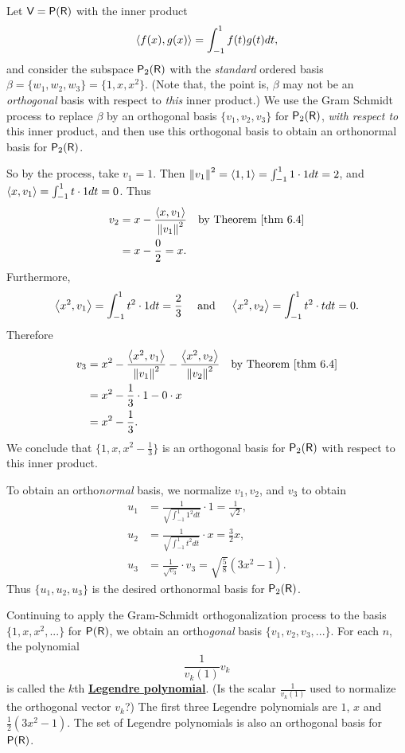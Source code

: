 \begin{example} \label{example 6.2.5}
Let \(\textsf{V} = \textsf{P}(\textsf{R})\) with the inner product
\[
    \left< f(x), g(x) \right> = \int_{-1}^{1} f(t)g(t) dt,
\]
and consider the subspace \(\textsf{P}_2(\textsf{R})\) with the \emph{standard} ordered basis \(\beta = \{ w_1, w_2, w_3 \} = \{ 1, x, x^2 \}\).
(Note that, the point is, \(\beta\) may not be an \emph{orthogonal} basis with respect to \emph{this} inner product.)
We use the Gram Schmidt process to replace \(\beta\) by an orthogonal basis \(\{v_1, v_2, v_3 \}\) for \(\textsf{P}_2(\textsf{R})\), \emph{with respect to} this inner product, and then use this orthogonal basis to obtain an orthonormal basis for \(\textsf{P}_2(\textsf{R})\).

So by the process, take \(v_1 = 1\).
Then \(\left\lVert v_1\right\rVert^2 = \left< 1, 1 \right> = \int_{-1}^1 1 \cdot 1 dt = 2\), and \(\left< x, v_1 \right> = \int_{-1}^1 t \cdot 1 dt = 0\).
Thus
\begin{align*}
    v_2 & = x - \frac{\LG x, v_1 \RG}{\norm{v_1}^2} & \text{by \THM{6.4}} \\
        & = x - \frac{0}{2} = x.
\end{align*}
Furthermore,
\[
    \left< x^2, v_1 \right> = \int_{-1}^1 t^2 \cdot 1 dt = \frac{2}{3} \quad \text{ and } \quad \left< x^2, v_2 \right> = \int_{-1}^1 t^2 \cdot t dt = 0.
\]
Therefore
\begin{align*}
    v_3 & = x^2 - \frac{\LG x^2, v_1 \RG}{\norm{v_1}^2} - \frac{\LG x^2, v_2 \RG}{\norm{v_2}^2} & \text{by \THM{6.4}} \\
        & = x^2 - \frac{1}{3} \cdot 1 - 0 \cdot x \\
        & = x^2 - \frac{1}{3}.
\end{align*}
We conclude that \(\{ 1, x, x^2 - \frac{1}{3} \}\) is an orthogonal basis for \(\textsf{P}_2(\textsf{R})\) with respect to this inner product.

To obtain an ortho\emph{normal} basis, we normalize \(v_1, v_2\), and \(v_3\) to obtain
\begin{align*}
    u_1 & = \frac{1}{\sqrt{\int_{-1}^1 1^2 dt}} \cdot 1 = \frac{1}{\sqrt{2}}, \\
    u_2 & = \frac{1}{\sqrt{\int_{-1}^1 t^2 dt}} \cdot x = \frac{3}{2} x, \\
    u_3 & = \frac{1}{\sqrt{v_3}} \cdot v_3 = \sqrt{\frac{5}{8}}(3x^2 - 1).
\end{align*}
Thus \(\{ u_1, u_2, u_3 \}\) is the desired orthonormal basis for \(\textsf{P}_2(\textsf{R})\).
\end{example}

\begin{remark} \label{remark 6.2.4}
Continuing to apply the Gram-Schmidt orthogonalization process to the basis \(\{ 1, x, x^2, ... \}\) for \(\textsf{P}(\textsf{R})\), we obtain an ortho\emph{gonal} basis \(\{ v_1, v_2, v_3, ... \}\).
For each \(n\), the polynomial
\[
    \frac{1}{v_k(1)} v_k
\]
is called the \(k\)th \textbf{\href{https://www.wikiwand.com/en/Legendre_polynomials\#/Orthogonality_and_completeness}{Legendre polynomial}}.
(Is the scalar \(\frac{1}{v_k(1)}\) used to normalize the orthogonal vector \(v_k\)?)
The first three Legendre polynomials are \(1\), \(x\) and \(\frac{1}{2} (3x^2 - 1)\).
The set of Legendre polynomials is also an orthogonal basis for \(\textsf{P}(\textsf{R})\).
\end{remark}


